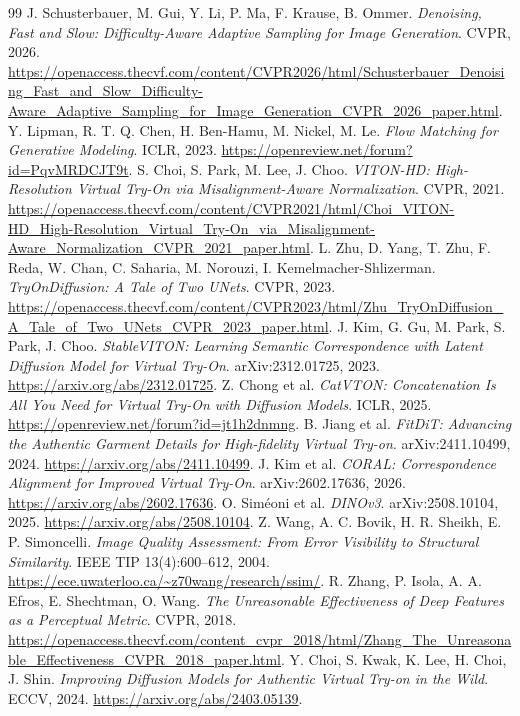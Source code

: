 \documentclass[11pt,a4paper]{article}
\begin{document}
\begin{thebibliography}{99}
 J. Schusterbauer, M. Gui, Y. Li, P. Ma, F. Krause, B. Ommer. \emph{Denoising, Fast and Slow: Difficulty-Aware Adaptive Sampling for Image Generation}. CVPR, 2026. \url{https://openaccess.thecvf.com/content/CVPR2026/html/Schusterbauer_Denoising_Fast_and_Slow_Difficulty-Aware_Adaptive_Sampling_for_Image_Generation_CVPR_2026_paper.html}.
 Y. Lipman, R. T. Q. Chen, H. Ben-Hamu, M. Nickel, M. Le. \emph{Flow Matching for Generative Modeling}. ICLR, 2023. \url{https://openreview.net/forum?id=PqvMRDCJT9t}.
 S. Choi, S. Park, M. Lee, J. Choo. \emph{VITON-HD: High-Resolution Virtual Try-On via Misalignment-Aware Normalization}. CVPR, 2021. \url{https://openaccess.thecvf.com/content/CVPR2021/html/Choi_VITON-HD_High-Resolution_Virtual_Try-On_via_Misalignment-Aware_Normalization_CVPR_2021_paper.html}.
 L. Zhu, D. Yang, T. Zhu, F. Reda, W. Chan, C. Saharia, M. Norouzi, I. Kemelmacher-Shlizerman. \emph{TryOnDiffusion: A Tale of Two UNets}. CVPR, 2023. \url{https://openaccess.thecvf.com/content/CVPR2023/html/Zhu_TryOnDiffusion_A_Tale_of_Two_UNets_CVPR_2023_paper.html}.
 J. Kim, G. Gu, M. Park, S. Park, J. Choo. \emph{StableVITON: Learning Semantic Correspondence with Latent Diffusion Model for Virtual Try-On}. arXiv:2312.01725, 2023. \url{https://arxiv.org/abs/2312.01725}.
 Z. Chong et al. \emph{CatVTON: Concatenation Is All You Need for Virtual Try-On with Diffusion Models}. ICLR, 2025. \url{https://openreview.net/forum?id=jt1h2dnmng}.
 B. Jiang et al. \emph{FitDiT: Advancing the Authentic Garment Details for High-fidelity Virtual Try-on}. arXiv:2411.10499, 2024. \url{https://arxiv.org/abs/2411.10499}.
 J. Kim et al. \emph{CORAL: Correspondence Alignment for Improved Virtual Try-On}. arXiv:2602.17636, 2026. \url{https://arxiv.org/abs/2602.17636}.
 O. Siméoni et al. \emph{DINOv3}. arXiv:2508.10104, 2025. \url{https://arxiv.org/abs/2508.10104}.
 Z. Wang, A. C. Bovik, H. R. Sheikh, E. P. Simoncelli. \emph{Image Quality Assessment: From Error Visibility to Structural Similarity}. IEEE TIP 13(4):600--612, 2004. \url{https://ece.uwaterloo.ca/~z70wang/research/ssim/}.
 R. Zhang, P. Isola, A. A. Efros, E. Shechtman, O. Wang. \emph{The Unreasonable Effectiveness of Deep Features as a Perceptual Metric}. CVPR, 2018. \url{https://openaccess.thecvf.com/content_cvpr_2018/html/Zhang_The_Unreasonable_Effectiveness_CVPR_2018_paper.html}.
 Y. Choi, S. Kwak, K. Lee, H. Choi, J. Shin. \emph{Improving Diffusion Models for Authentic Virtual Try-on in the Wild}. ECCV, 2024. \url{https://arxiv.org/abs/2403.05139}.

\end{thebibliography}
\end{document}
